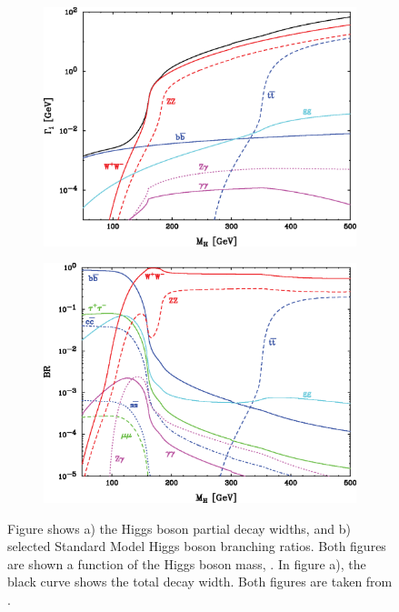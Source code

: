 \begin{figure}[tbph]
\centering
    \begin{subfigure}[b]{0.45\textwidth}
        \includegraphics[width=\textwidth]{theory/HiggsDecayWidth}
        \caption{}
        \label{fig:theoryHiggsDecayWidth}
    \end{subfigure}
    \begin{subfigure}[b]{0.45\textwidth}
        \includegraphics[width=\textwidth]{theory/HiggsBranchingRatio}
        \caption{}
        \label{fig:theoryHiggsBranchingRatio}
    \end{subfigure}
\caption[SM Higgs boson decay width and branching ratios]%
{Figure shows a) the Higgs boson partial decay widths, and b) selected Standard Model Higgs boson branching ratios. Both figures are shown a function of the Higgs boson mass, \Hmass. In figure a), the black curve shows the total decay width. Both figures are taken from \cite{Rainwater:2007cp}.}
\label{fig:theoryHiggsPhenomenology}
\end{figure}


